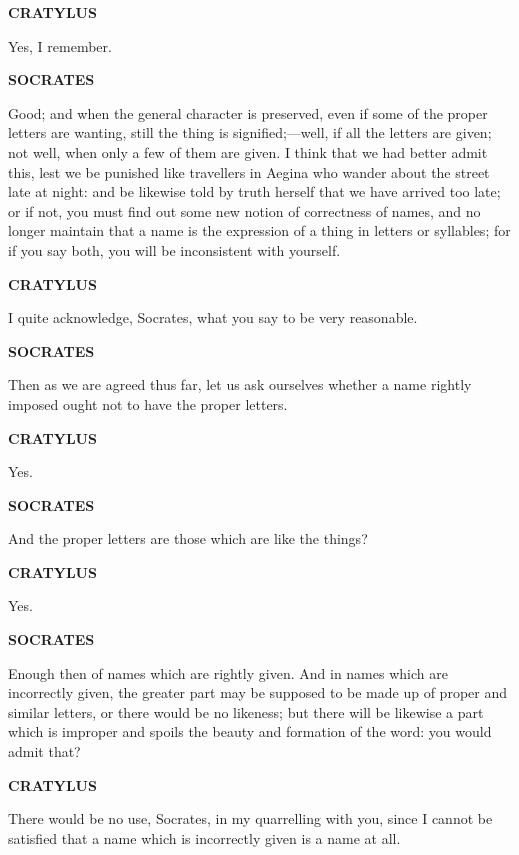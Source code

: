 \documentclass[11pt,letter]{article}
\begin{document}
\par \textbf{CRATYLUS}
\par   Yes, I remember.

\par \textbf{SOCRATES}
\par   Good; and when the general character is preserved, even if some of the proper letters are wanting, still the thing is signified;—well, if all the letters are given; not well, when only a few of them are given. I think that we had better admit this, lest we be punished like travellers in Aegina who wander about the street late at night:  and be likewise told by truth herself that we have arrived too late; or if not, you must find out some new notion of correctness of names, and no longer maintain that a name is the expression of a thing in letters or syllables; for if you say both, you will be inconsistent with yourself.

\par \textbf{CRATYLUS}
\par   I quite acknowledge, Socrates, what you say to be very reasonable.

\par \textbf{SOCRATES}
\par   Then as we are agreed thus far, let us ask ourselves whether a name rightly imposed ought not to have the proper letters.

\par \textbf{CRATYLUS}
\par   Yes.

\par \textbf{SOCRATES}
\par   And the proper letters are those which are like the things?

\par \textbf{CRATYLUS}
\par   Yes.

\par \textbf{SOCRATES}
\par   Enough then of names which are rightly given. And in names which are incorrectly given, the greater part may be supposed to be made up of proper and similar letters, or there would be no likeness; but there will be likewise a part which is improper and spoils the beauty and formation of the word:  you would admit that?

\par \textbf{CRATYLUS}
\par   There would be no use, Socrates, in my quarrelling with you, since I cannot be satisfied that a name which is incorrectly given is a name at all.
\end{document}
